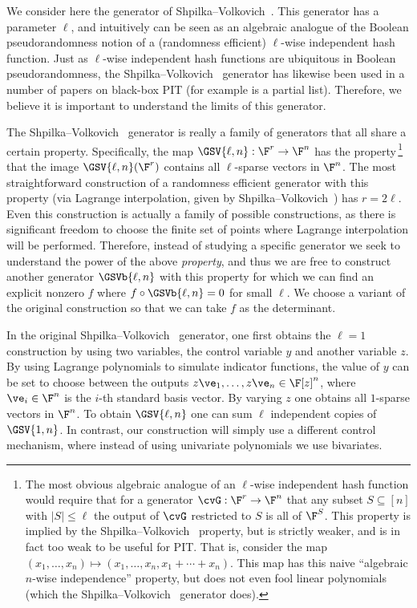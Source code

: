 \documentclass{toc}
\begin{document}
We consider here the generator of Shpilka--Volkovich~\cite{ShpilkaVolkovich09}. This generator has a parameter $\ell$, and intuitively can be seen as an algebraic analogue of the Boolean pseudorandomness notion of a (randomness efficient) $\ell$-wise independent hash function.  Just as $\ell$-wise independent hash functions are ubiquitous in Boolean pseudorandomness, the Shpilka--Volkovich~\cite{ShpilkaVolkovich09} generator has likewise been used in a number of papers on black-box PIT (for example \cite{ShpilkaVolkovich09,AndersonvMV11,ForbesShpilka13a,ForbesSS14,Volkovich15,Forbes15} is a partial list).
Therefore,  %
we believe it is important to understand the limits of this generator.

%

The Shpilka--Volkovich~\cite{ShpilkaVolkovich09} generator is really a family of generators that all share a certain property. Specifically, the map $\GSV{\ell,n}:\F^{r}\to\F^n$ has the property\,\footnote{The most obvious algebraic analogue of an $\ell$-wise independent hash function would require that for a generator $\cvG:\F^r\to\F^n$ that any subset $S\subseteq[n]$ with $|S|\le \ell$ the output of $\cvG$ restricted to $S$ is all of $\F^{S}$.  This property is implied by the Shpilka--Volkovich~\cite{ShpilkaVolkovich09} property, but is strictly weaker, and is in fact too weak to be useful for PIT\@.  That is, consider the map $(x_1,\ldots,x_n)\mapsto (x_1,\ldots,x_n,x_1+\cdots+x_n)$.  This map has this naive ``algebraic $n$-wise independence'' property, but does not even fool linear polynomials (which the Shpilka--Volkovich~\cite{ShpilkaVolkovich09} generator does).} that the image $\GSV{\ell,n}(\F^r)$ contains all $\ell$-sparse vectors in $\F^n$.  The most straightforward construction  of a randomness efficient generator with this property (via Lagrange interpolation, given by Shpilka--Volkovich~\cite{ShpilkaVolkovich09}) has $r=2\ell$.  Even this construction is actually a family of possible constructions, as there is significant freedom to choose the finite set of points where Lagrange interpolation will be performed.  Therefore,  %
instead of studying a specific generator we seek to understand the power of the above \emph{property}, and thus we are free to construct another generator $\GSVb{\ell,n}$ with this property for which we can find an explicit nonzero $f$ where $f\circ \GSVb{\ell,n}=0$ for small $\ell$. We choose a variant of the original construction so that we can take $f$ as the determinant.

In the original Shpilka--Volkovich~\cite{ShpilkaVolkovich09} generator, one first obtains the $\ell=1$ construction by using two variables, the control variable $y$ and another variable $z$.  By using Lagrange polynomials to simulate indicator functions, the value of $y$ can be set to choose between the outputs $z\ve_1,\ldots,z\ve_n\in\F[z]^n$, where $\ve_i\in\F^n$ is the $i$-th standard basis vector.  By varying $z$ one obtains all $1$-sparse vectors in $\F^n$.  To obtain $\GSV{\ell,n}$ one can sum $\ell$ independent copies of $\GSV{1,n}$.  In contrast, our construction will simply use a different control mechanism, where instead of using univariate polynomials we use bivariates.
\end{document}
